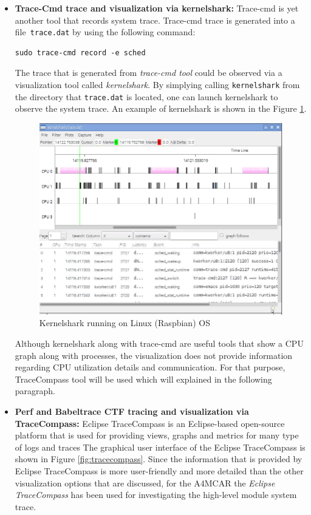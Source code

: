 \begin{itemize}
	\item \textbf{Trace-Cmd trace and visualization via kernelshark:}
	Trace-cmd \cite{tracecmd} is yet another tool that records system trace. Trace-cmd trace is generated into a file\texttt{ trace.dat} by using the following command:
	\begin{lstlisting}[style=bash]
		sudo trace-cmd record -e sched
	\end{lstlisting}
	The trace that is generated from \textit{trace-cmd tool} could be observed via a visualization tool called \textit{kernelshark}. By simplying calling \texttt{kernelshark} from the directory that \texttt{trace.dat} is located, one can launch kernelshark to observe the system trace. An example of kernelshark is shown in the Figure \ref{fig:kernelshark}.
	\begin{figure}[!ht]
		\centering
		\captionsetup{justification=centering}
		\includegraphics[scale=0.55]{content/images/kernelshark.png}
		\caption{Kernelshark running on Linux (Raspbian) OS}
		\label{fig:kernelshark}
	\end{figure}
	Although kernelshark along with trace-cmd are useful tools that show a CPU graph along with processes, the visualization does not provide information regarding CPU utilization details and communication. For that purpose, TraceCompass tool will be used which will explained in the following paragraph. 
	\item \textbf{Perf and Babeltrace CTF tracing and visualization via TraceCompass:} 	Eclipse TraceCompass \cite{tracecompass} is an Eclipse-based open-source platform that is used for providing views, graphs and metrics for many type of logs and traces \cite{tracecompass} The graphical user interface of the Eclipse TraceCompass is shown in Figure \ref{fig:tracecompass}. Since the information that is provided by Eclipse TraceCompass is more user-friendly and more detailed than the other visualization options that are discussed, for the A4MCAR the \textit{Eclipse TraceCompass} has been used for investigating the high-level module system trace.
	

\end{itemize}

